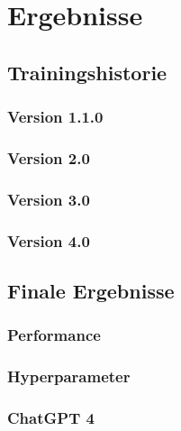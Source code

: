 \section{Ergebnisse}
\subsection{Trainingshistorie}
\subsubsection{Version 1.1.0}
\subsubsection{Version 2.0}
\subsubsection{Version 3.0}
\subsubsection{Version 4.0}
\subsection{Finale Ergebnisse}
\subsubsection{Performance}
\subsubsection{Hyperparameter}
\subsubsection{ChatGPT 4}